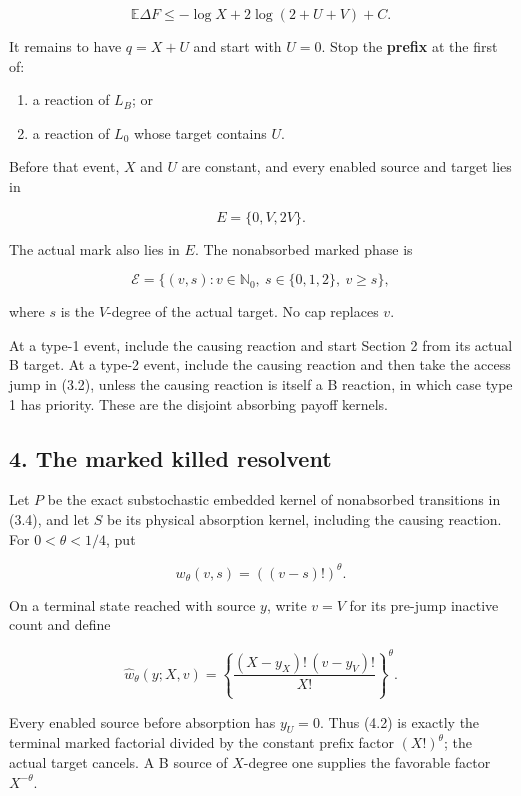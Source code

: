 \[
             \mathbb E\Delta F\le
                -\log X+2\log(2+U+V)+C.             \tag{3.2}
\]

It remains to have \(q=X+U\) and start with \(U=0\). Stop the
\textbf{prefix} at the first of:

\begin{enumerate}
\def\labelenumi{\arabic{enumi}.}
\tightlist
\item
  a reaction of \(L_B\); or
\item
  a reaction of \(L_0\) whose target contains \(U\).
\end{enumerate}

Before that event, \(X\) and \(U\) are constant, and every enabled
source and target lies in

\[
                             E=\{0,V,2V\}.            \tag{3.3}
\]

The actual mark also lies in \(E\). The nonabsorbed marked phase is

\[
              \mathcal E=\{(v,s):v\in\mathbb N_0,\ 
                              s\in\{0,1,2\},\ v\ge s\}, \tag{3.4}
\]

where \(s\) is the \(V\)-degree of the actual target. No cap replaces
\(v\).

At a type-1 event, include the causing reaction and start Section 2 from
its actual B target. At a type-2 event, include the causing reaction and
then take the access jump in (3.2), unless the causing reaction is
itself a B reaction, in which case type 1 has priority. These are the
disjoint absorbing payoff kernels.

\subsection{4. The marked killed
resolvent}

Let \(P\) be the exact substochastic embedded kernel of nonabsorbed
transitions in (3.4), and let \(S\) be its physical absorption kernel,
including the causing reaction. For \(0<\theta<1/4\), put

\[
                         w_\theta(v,s)=((v-s)!)^\theta. \tag{4.1}
\]

On a terminal state reached with source \(y\), write \(v=V\) for its
pre-jump inactive count and define

\[
 \widehat w_\theta(y;X,v)
   =\left\{\frac{(X-y_X)!\,(v-y_V)!}{X!}\right\}^{\!\theta}. \tag{4.2}
\]

Every enabled source before absorption has \(y_U=0\). Thus (4.2) is
exactly the terminal marked factorial divided by the constant prefix
factor \((X!)^\theta\); the actual target cancels. A B source of
\(X\)-degree one supplies the favorable factor \(X^{-\theta}\).

